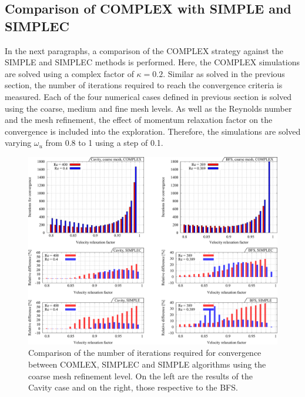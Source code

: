 \documentclass[final,3p,times,11pt,onecolumn]{myElsarticle}
\numberwithin{equation}{section}
\begin{document}
\subsection{Comparison of COMPLEX with SIMPLE and SIMPLEC}
In the next paragraphs, a comparison of the COMPLEX strategy against the SIMPLE and SIMPLEC methods is performed. Here, the COMPLEX	 simulations are solved using a complex factor of $\kappa = 0.2$. 
Similar as solved in the previous section, the number of iterations required to reach the convergence criteria is measured. Each of the four numerical cases defined in previous section is solved using the coarse, medium and fine mesh levels. As well as the Reynolds number and the mesh refinement, the effect of momentum relaxation factor on the convergence is included into the exploration. Therefore, the simulations are solved varying $\omega_u$ from 0.8 to 1 using a step of 0.1.
\begin{figure}[t!]
\centering
\includegraphics[width=17cm]{fig/Results/complexCoarse.pdf}
\caption{Comparison of the number of iterations required for convergence between COMLEX, SIMPLEC and SIMPLE algorithms using the coarse mesh refinement level. On the left are the results of the Cavity case and on the right, those respective to the BFS.}
\label{Fig:complexCoarse}
\end{figure}
\end{document}
